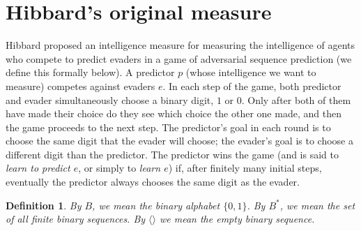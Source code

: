 \documentclass{article}
\newtheorem{definition}[theorem]{Definition}
\begin{document}
\section{Hibbard's original measure}
\label{originalmeasuresection}

Hibbard proposed an intelligence measure for measuring the intelligence
of agents who compete to predict evaders in a game of
adversarial sequence prediction (we define this
formally below). A predictor $p$ (whose intelligence we want to measure)
competes against evaders $e$. In each step of the game,
both predictor and evader simultaneously choose a binary digit, $1$ or $0$.
Only after both of them have made their choice do they see which choice the other
one made, and then the game proceeds to the next step. The predictor's goal in
each round is to choose the same digit that the evader will choose;
the evader's goal is to choose a different digit than the predictor. The predictor
wins the game (and is said to \emph{learn to predict $e$}, or simply to
\emph{learn $e$}) if, after finitely many
initial steps, eventually the predictor always chooses the same digit as the
evader.

\begin{definition}
By $B$, we mean the binary alphabet $\{0,1\}$. By $B^*$, we mean the set of all
finite binary sequences. By $\langle\rangle$ we mean the empty binary sequence.
\end{definition}
\end{document}
